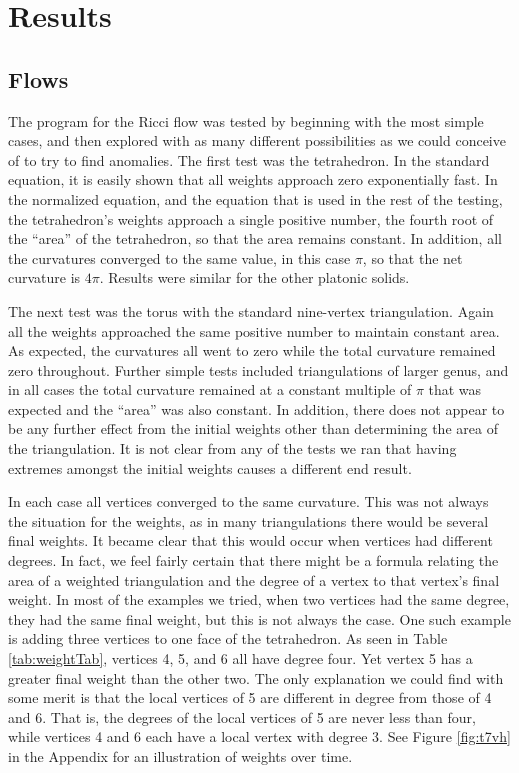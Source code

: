 \documentclass[12pt]{article}
\begin{document}
\section{Results}

\subsection{Flows}

The program for the Ricci flow was tested by beginning with the most simple cases, and then explored with as many different possibilities as we could conceive of to try to find anomalies. The first test was the tetrahedron. In the standard equation, it is easily shown that all weights approach zero exponentially fast. In the normalized equation, and the equation that is used in the rest of the testing, the tetrahedron's weights approach a single positive number, the fourth root of the ``area'' of the tetrahedron, so that the area remains constant. In addition, all the curvatures converged to the same value, in this case $\pi$, so that the net curvature is $4\pi$. Results were similar for the other platonic solids.\newline

\noindent The next test was the torus with the standard nine-vertex triangulation. Again all the weights approached the same positive number to maintain constant area. As expected, the curvatures all went to zero while the total curvature remained zero throughout. Further simple tests included triangulations of larger genus, and in all cases the total curvature remained at a constant multiple of $\pi$ that was expected and the ``area'' was also constant. In addition, there does not appear to be any further effect from the initial weights other than determining the area of the triangulation. It is not clear from any of the tests we ran that having extremes amongst the initial weights causes a different end result.\newline

\noindent In each case all vertices converged to the same curvature. This was not always the situation for the weights, as in many triangulations there would be several final weights. It became clear that this would occur when vertices had different degrees. In fact, we feel fairly certain that there might be a formula relating the area of a weighted triangulation and the degree of a vertex to that vertex's final weight. In most of the examples we tried, when two vertices had the same degree, they had the same final weight, but this is not always the case. One such example is adding three vertices to one face of the tetrahedron. As seen in Table \ref{tab:weightTab}, vertices 4, 5, and 6 all have degree four. Yet vertex 5 has a greater final weight than the other two. The only explanation we could find with some merit is that the local vertices of 5 are different in degree from those of 4 and 6. That is, the degrees of the local vertices of 5 are never less than four, while vertices 4 and 6 each have a local vertex with degree 3. See Figure \ref{fig:t7vh} in the Appendix for an illustration of weights over time.\newline 
\end{document}

